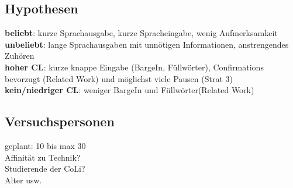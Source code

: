 \documentclass[12pt,a4paper]{scrartcl}
\begin{document}
\subsection{Hypothesen}
\textbf{beliebt}: kurze Sprachausgabe, kurze Spracheingabe, wenig Aufmerksamkeit \\
\textbf{unbeliebt}: lange Sprachausgaben mit unnötigen Informationen, anstrengendes Zuhören\\
\textbf{hoher CL}: kurze knappe Eingabe (BargeIn, Füllwörter), Confirmations bevorzugt (Related Work) und möglichst viele Pausen (Strat 3)\\
\textbf{kein/niedriger CL}: weniger BargeIn und Füllwörter(Related Work)




\subsection{Versuchspersonen}
geplant: 10 bis max 30\\
Affinität zu Technik?\\
Studierende der CoLi?\\
Alter usw.\\
\end{document}
